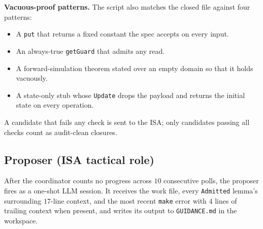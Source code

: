 \textbf{Vacuous-proof patterns.} The script also matches the closed file against four patterns:
\begin{itemize}[leftmargin=*,itemsep=2pt,topsep=2pt]
\item A \texttt{put} that returns a fixed constant the spec accepts on every input.
\item An always-true \texttt{getGuard} that admits any read.
\item A forward-simulation theorem stated over an empty domain so that it holds vacuously.
\item A state-only stub whose \texttt{Update} drops the payload and returns the initial state on every operation.
\end{itemize}

A candidate that fails any check is sent to the ISA; only candidates passing all checks count as audit-clean closures.

\subsection{Proposer (ISA tactical role)}
\label{app:guide}

After the coordinator counts no progress across $10$ consecutive polls, the proposer fires as a one-shot LLM session. It receives the work file, every \texttt{Admitted} lemma's surrounding $17$-line context, and the most recent \texttt{make} error with $4$ lines of trailing context when present, and writes its output to \texttt{GUIDANCE.md} in the workspace.

